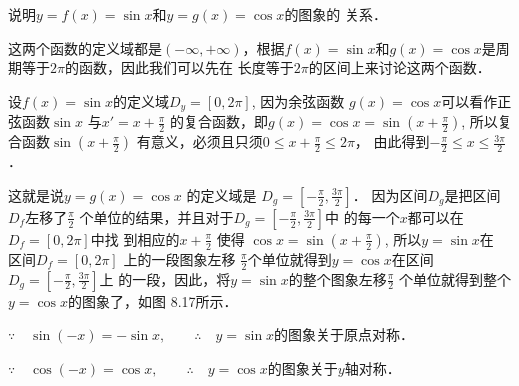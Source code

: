 \begin{example}
    说明$y=f(x)=\sin x$和$y=g(x)=\cos x$的图象的
关系．
\end{example}


\begin{solution}
 这两个函数的定义域都是$(-\infty,+\infty)$，根据$f(x)=
\sin x$和$g(x)=\cos x$是周期等于$2\pi$的函数，因此我们可以先在
长度等于$2\pi$的区间上来讨论这两个函数．

设$f(x)=\sin x$的定义域$D_y=[0,2\pi]$, 因为余弦函数
$g(x)=\cos x$可以看作正弦函数$\sin x$ 与$x'=x+\frac{\pi}{2}$
的复合函数，即$g(x)=\cos x=\sin\left(x+\frac{\pi}{2}\right)$,
所以复合函数$\sin\left(x+\frac{\pi}{2} \right)$
有意义，必须且只须$0\le x+\frac{\pi}{2}\le 2\pi$，
由此得到$-\frac{\pi}{2}\le x\le \frac{3\pi}{2}$．

这就是说$y=g(x)=\cos x$ 的定义域是
$D_g=\left[-\frac{\pi}{2},\frac{3\pi}{2}\right]$．
因为区间$D_g$是把区间$D_f$左移了$\frac{\pi}{2}$
个单位的结果，并且对于$D_g=\left[-\frac{\pi}{2},\frac{3\pi}{2}\right]$中
的每一个$x$都可以在$D_f=[0,2\pi ]$中找
到相应的$x+\frac{\pi}{2}$
使得
$\cos x=\sin\left(x+\frac{\pi}{2}\right)$,
所以$y=\sin x$在
区间$D_f=[0,2\pi]$ 上的一段图象左移
$\frac{\pi}{2}$个单位就得到$y=\cos x$在区间$D_g=
\left[-\frac{\pi}{2},\frac{3\pi}{2}\right]$上
的一段，因此，将$y=\sin x$的整个图象左移$\frac{\pi}{2}$
个单位就得到整个$y=\cos x$的图象了，如图
8.17所示．
\begin{figure}[htp]
    \centering
{}    
    \caption{}
\end{figure}

$\because\quad \sin(-x)=-\sin x,\qquad \therefore\quad y=\sin x$的图象关于原点对称．

$\because\quad \cos(-x)=\cos x,\qquad \therefore\quad y=\cos x$的图象关于$y$轴对称．

\end{solution}


